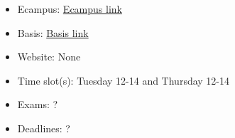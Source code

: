 \begin{tcolorbox}[enhanced,breakable,
	title=General Information,frame style={color=mycolor}]
    \begin{itemize}
        \item Ecampus: \href{https://ecampus.uni-bonn.de/goto.php?target=crs_3330449}{Ecampus link}
        \item Basis: \href{https://basis.uni-bonn.de/qisserver/rds?state=verpublish&status=init&vmfile=no&publishid=239886&moduleCall=webInfo&publishConfFile=webInfo&publishSubDir=veranstaltung}{Basis link}
        \item Website: None
        \item Time slot(s): Tuesday 12-14 and Thursday 12-14
        \item Exams: ?
        \item Deadlines: ?
    \end{itemize}
\end{tcolorbox}